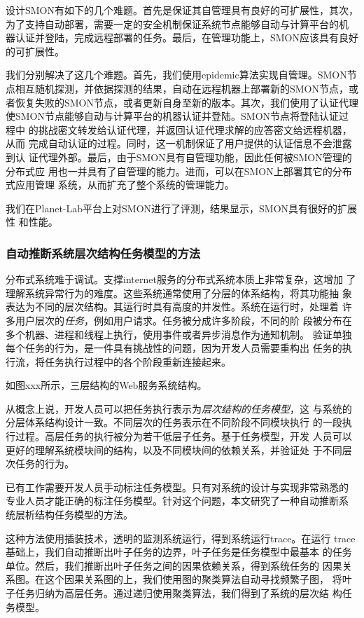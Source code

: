 设计SMON有如下的几个难题。首先是保证其自管理具有良好的可扩展性，其次，
为了支持自动部署，需要一定的安全机制保证系统节点能够自动与计算平台的机
器认证并登陆，完成远程部署的任务。最后，在管理功能上，SMON应该具有良好
的可扩展性。

我们分别解决了这几个难题。首先，我们使用epidemic算法实现自管理。SMON节
点相互随机探测，并依据探测的结果，自动在远程机器上部署新的SMON节点，或
者恢复失败的SMON节点，或者更新自身至新的版本。其次，我们使用了认证代理
使SMON节点能够自动与计算平台的机器认证并登陆。SMON节点将登陆认证过程中
的挑战密文转发给认证代理，并返回认证代理求解的应答密文给远程机器，从而
完成自动认证的过程。同时，这一机制保证了用户提供的认证信息不会泄露到认
证代理外部。最后，由于SMON具有自管理功能，因此任何被SMON管理的分布式应
用也一并具有了自管理的能力。进而，可以在SMON上部署其它的分布式应用管理
系统，从而扩充了整个系统的管理能力。

我们在Planet-Lab平台上对SMON进行了评测，结果显示，SMON具有很好的扩展性
和性能。

\subsubsection*{自动推断系统层次结构任务模型的方法}

分布式系统难于调试。支撑internet服务的分布式系统本质上非常复杂，这增加
了理解系统异常行为的难度。这些系统通常使用了分层的体系结构，将其功能抽
象表达为不同的层次结构。其运行时具有高度的并发性。系统在运行时，处理着
许多用户层次的\emph{任务}，例如用户请求。任务被分成许多阶段，不同的阶
段被分布在多个机器、进程和线程上执行，使用事件或者异步消息作为通知机制。
验证单独每个任务的行为，是一件具有挑战性的问题，因为开发人员需要重构出
任务的执行流，将任务执行过程中的各个阶段重新连接起来。

如图xxx所示，三层结构的Web服务系统结构。

从概念上说，开发人员可以把任务执行表示为\emph{层次结构的任务模型}，这
与系统的分层体系结构设计一致。不同层次的任务表示在不同阶段不同模块执行
的一段执行过程。高层任务的执行被分为若干低层子任务。基于任务模型，开发
人员可以更好的理解系统模块间的结构，以及不同模块间的依赖关系，并验证处
于不同层次任务的行为。

已有工作需要开发人员手动标注任务模型。只有对系统的设计与实现非常熟悉的
专业人员才能正确的标注任务模型。针对这个问题，本文研究了一种自动推断系
统层析结构任务模型的方法。

这种方法使用插装技术，透明的监测系统运行，得到系统运行trace。在运行
trace基础上，我们自动推断出叶子任务的边界，叶子任务是任务模型中最基本
的任务单位。然后，我们推断出叶子任务之间的因果依赖关系，得到系统任务的
因果关系图。在这个因果关系图的上，我们使用图的聚类算法自动寻找频繁子图，
将叶子任务归纳为高层任务。通过递归使用聚类算法，我们得到了系统的层次结
构任务模型。

